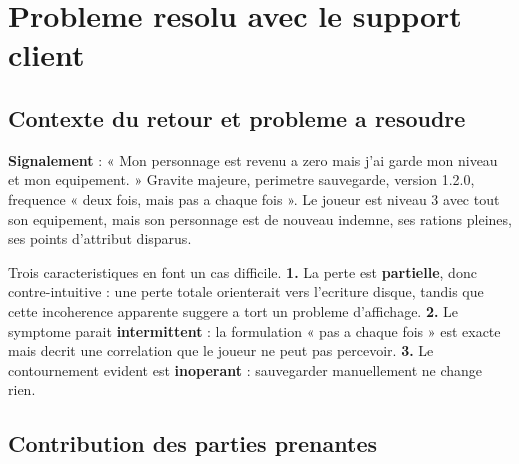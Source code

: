 \section{Probleme resolu avec le support client}
\label{sec:support}



\subsection{Contexte du retour et probleme a resoudre}

\textbf{Signalement} : « Mon personnage est revenu a zero mais j'ai garde mon niveau et mon
equipement. » Gravite majeure, perimetre sauvegarde, version 1.2.0, frequence « deux fois, mais pas
a chaque fois ». Le joueur est niveau 3 avec tout son equipement, mais son personnage est de
nouveau indemne, ses rations pleines, ses points d'attribut disparus.

Trois caracteristiques en font un cas difficile. \textbf{1.} La perte est \textbf{partielle}, donc
contre-intuitive : une perte totale orienterait vers l'ecriture disque, tandis que cette
incoherence apparente suggere a tort un probleme d'affichage. \textbf{2.} Le symptome parait
\textbf{intermittent} : la formulation « pas a chaque fois » est exacte mais decrit une correlation
que le joueur ne peut pas percevoir. \textbf{3.} Le contournement evident est \textbf{inoperant} :
sauvegarder manuellement ne change rien.

\subsection{Contribution des parties prenantes}

